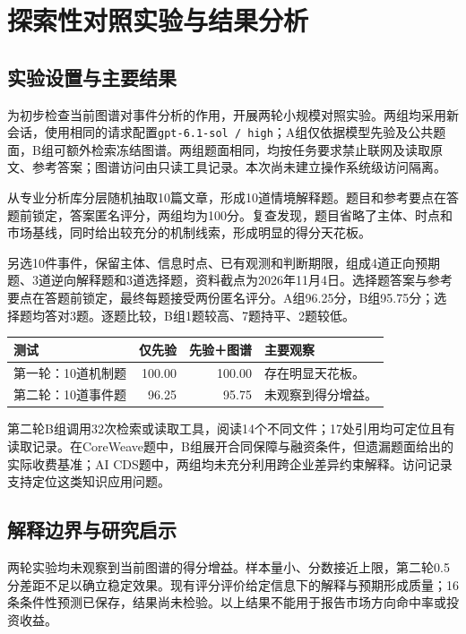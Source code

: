 \documentclass[11pt,letterpaper]{article}
\begin{document}
\newpage
\section{探索性对照实验与结果分析}

\subsection{实验设置与主要结果}

为初步检查当前图谱对事件分析的作用，开展两轮小规模对照实验。两组均采用新会话，使用相同的请求配置\texttt{gpt-6.1-sol / high}；A组仅依据模型先验及公共题面，B组可额外检索冻结图谱。两组题面相同，均按任务要求禁止联网及读取原文、参考答案；图谱访问由只读工具记录。本次尚未建立操作系统级访问隔离。

从专业分析库分层随机抽取10篇文章，形成10道情境解释题。题目和参考要点在答题前锁定，答案匿名评分，两组均为100分。复查发现，题目省略了主体、时点和市场基线，同时给出较充分的机制线索，形成明显的得分天花板。

另选10件事件，保留主体、信息时点、已有观测和判断期限，组成4道正向预期题、3道逆向解释题和3道选择题，资料截点为2026年11月4日。选择题答案与参考要点在答题前锁定，最终每题接受两份匿名评分。A组96.25分，B组95.75分；选择题均答对3题。逐题比较，B组1题较高、7题持平、2题较低。

\begin{center}
\small
\begin{tabularx}{\textwidth}{@{}YrrL{0.28\textwidth}@{}}
\toprule
测试 & 仅先验 & 先验＋图谱 & 主要观察 \\
\midrule
第一轮：10道机制题 & 100.00 & 100.00 & 存在明显天花板。 \\
第二轮：10道事件题 & 96.25 & 95.75 & 未观察到得分增益。 \\
\bottomrule
\end{tabularx}
\end{center}

第二轮B组调用32次检索或读取工具，阅读14个不同文件；17处引用均可定位且有读取记录。在CoreWeave题中，B组展开合同保障与融资条件，但遗漏题面给出的实际收费基准；AI CDS题中，两组均未充分利用跨企业差异约束解释。访问记录支持定位这类知识应用问题。

\subsection{解释边界与研究启示}

两轮实验均未观察到当前图谱的得分增益。样本量小、分数接近上限，第二轮0.5分差距不足以确立稳定效果。现有评分评价给定信息下的解释与预期形成质量；16条条件性预测已保存，结果尚未检验。以上结果不能用于报告市场方向命中率或投资收益。
\end{document}
